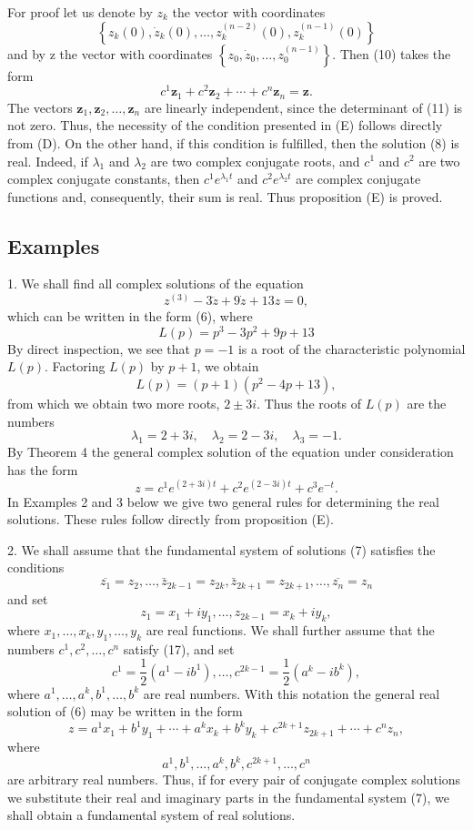 \documentclass[10pt,a5paper]{book}
\theoremstyle{plain}
\theoremstyle{definition}
\theoremstyle{remark}
\begin{document}
For proof let us denote by $z_{k}$ the vector with coordinates
\[
\left\{z_{k}(0), \dot{z}_{k}(0), \ldots, z_{k}^{(n-2)}(0), z_{k}^{(n-1)}(0)\right\}
\]
and by z the vector with coordinates $\left\{z_{0}, \dot{z}_{0}, \ldots, z_{0}^{(n-1)}\right\}$. Then (10) takes the form
\[
c^{1} \mathbf{z}_{1}+c^{2} \mathbf{z}_{2}+\cdots+c^{n} \mathbf{z}_{n}=\mathbf{z} .
\]
The vectors $\mathbf{z}_{1}, \mathbf{z}_{2}, \ldots, \mathbf{z}_{n}$ are linearly independent, since the determinant of (11) is not zero. Thus, the necessity of the condition presented in (E) follows directly from (D). On the other hand, if this condition is fulfilled, then the solution (8) is real. Indeed, if $\lambda_{1}$ and $\lambda_{2}$ are two complex conjugate roots, and $c^{1}$ and $c^{2}$ are two complex conjugate constants, then $c^{1} e^{\lambda_{1} t}$ and $c^{2} e^{\lambda_{2} t}$ are complex conjugate functions and, consequently, their sum is real. Thus proposition (E) is proved.

\subsection*{Examples}
1. We shall find all complex solutions of the equation
\[
z^{(3)}-3 \ddot{z}+9 \dot{z}+13 z=0,
\]
which can be written in the form (6), where
\[
L(p)=p^{3}-3 p^{2}+9 p+13
\]
By direct inspection, we see that $p=-1$ is a root of the characteristic
polynomial $L(p)$. Factoring $L(p)$ by $p+1$, we obtain
\[
L(p)=(p+1)\left(p^{2}-4 p+13\right),
\]
from which we obtain two more roots, $2 \pm 3 i$. Thus the roots of $L(p)$ are the numbers
\[
\lambda_{1}=2+3 i, \quad \lambda_{2}=2-3 i, \quad \lambda_{3}=-1 .
\]
By Theorem 4 the general complex solution of the equation under consideration has the form
\[
z=c^{1} e^{(2+3 i) t}+c^{2} e^{(2-3 i) t}+c^{3} e^{-t} .
\]
In Examples 2 and 3 below we give two general rules for determining the real solutions. These rules follow directly from proposition (E).

2. We shall assume that the fundamental system of solutions (7) satisfies the conditions
\begin{equation*}
\overline{z_{1}}=z_{2}, \ldots, \bar{z}_{2 k-1}=z_{2 k}, \bar{z}_{2 k+1}=z_{2 k+1}, \ldots, \overline{z_{n}}=z_{n} \tag{18}
\end{equation*}
and set
\[
z_{1}=x_{1}+i y_{1}, \ldots, z_{2 k-1}=x_{k}+i y_{k},
\]
where $x_{1}, \ldots, x_{k}, y_{1}, \ldots, y_{k}$ are real functions. We shall further assume that the numbers $c^{1}, c^{2}, \ldots, c^{n}$ satisfy (17), and set
\[
c^{1}=\frac{1}{2}\left(a^{1}-i b^{1}\right), \ldots, c^{2 k-1}=\frac{1}{2}\left(a^{k}-i b^{k}\right),
\]
where $a^{1}, \ldots, a^{k}, b^{1}, \ldots, b^{k}$ are real numbers. With this notation the general real solution of (6) may be written in the form
\[
z=a^{1} x_{1}+b^{1} y_{1}+\cdots+a^{k} x_{k}+b^{k} y_{k}+c^{2 k+1} z_{2 k+1}+\cdots+c^{n} z_{n},
\]
where
\[
a^{1}, b^{1}, \ldots, a^{k}, b^{k}, c^{2 k+1}, \ldots, c^{n}
\]
are arbitrary real numbers. Thus, if for every pair of conjugate complex solutions we substitute their real and imaginary parts in the fundamental system (7), we shall obtain a fundamental system of real solutions.
\end{document}
